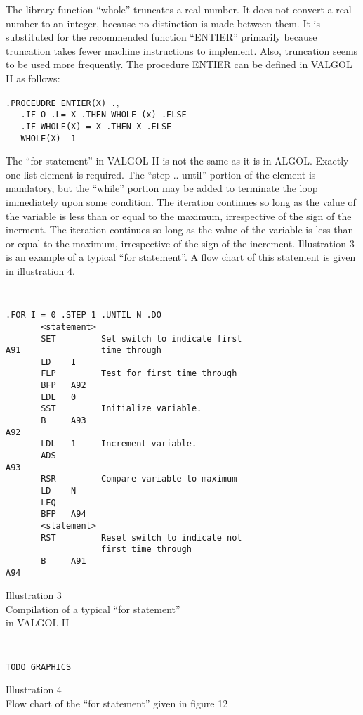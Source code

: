 \documentclass[twocolumn]{article}
\begin{document}
The library function ``whole'' truncates a real number.
It does not convert a real number to an integer, because no distinction is made
between them.
It is substituted for the recommended function ``ENTIER'' primarily because
truncation takes fewer machine instructions to implement.
Also, truncation seems to be used more frequently.
The procedure ENTIER can be defined in VALGOL II as follows:

\begin{center}
{\tt .PROCEUDRE ENTIER(X) .}, \\
{\tt \ \ \ .IF O .L= X .THEN WHOLE (x) .ELSE} \\
{\tt \ \ \ .IF WHOLE(X) = X .THEN X .ELSE} \\
{\tt \ \ \ WHOLE(X) -1}
\end{center}

The ``for statement'' in VALGOL II is not the same as it is in ALGOL.
Exactly one list element is required.
The ``step .. until'' portion of the element is mandatory, but the ``while''
portion may be added to terminate the loop immediately upon some condition.
The iteration continues so long as the value of the variable is less than
or equal to the maximum, irrespective of the sign of the incrment.
The iteration continues so long as the value of the variable is less than
or equal to the maximum, irrespective of the sign of the increment.
Illustration 3 is an example of a typical ``for statement''.
A flow chart of this statement is given in illustration 4.

\begin{center}
{\tt
\begin{verbatim}
.FOR I = 0 .STEP 1 .UNTIL N .DO
       <statement>
       SET         Set switch to indicate first
A91                time through
       LD    I
       FLP         Test for first time through
       BFP   A92
       LDL   0
       SST         Initialize variable.
       B     A93
A92
       LDL   1     Increment variable.
       ADS
A93
       RSR         Compare variable to maximum
       LD    N
       LEQ
       BFP   A94
       <statement>
       RST         Reset switch to indicate not
                   first time through
       B     A91
A94
\end{verbatim}
}
Illustration 3 \\
Compilation of a typical ``for statement'' \\
in VALGOL II
\end{center}

\begin{center}
{\tt
\begin{verbatim}
TODO GRAPHICS
\end{verbatim}
}
Illustration 4 \\
Flow chart of the ``for statement''
given in figure 12
\end{center}
\end{document}
